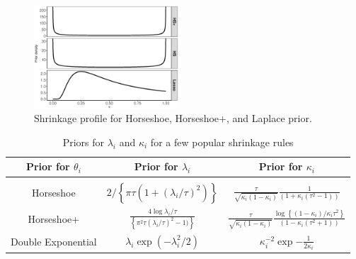 \documentclass[11pt]{article}
\begin{document}
\begin{figure}[!ht]
\centering
\includegraphics[width=0.48\textwidth]{prior_diff_kappa}
\caption{\footnotesize{Shrinkage profile for Horseshoe, Horseshoe+, and Laplace prior.}}
\label{fig:priorkappa}
\end{figure}

\begin{table}[!ht]
\centering
\caption{Priors for $\lambda_i$ and $\kappa_i$ for a few popular shrinkage rules}
\begin{tabular}{ccc}
\hline
Prior for $\theta_i$ & Prior for $\lambda_i$ & Prior for $\kappa_i$ \\ 
\hline \\
Horseshoe & $2/ \left\{ \pi \tau (1 + (\lambda_i/\tau)^2 )\right\}$  & $\frac{\tau}{\sqrt{\kappa_i (1-\kappa_i )}} \frac{1}{(1+\kappa_i (\tau^2 -1 ) )}$ \\[10pt]
Horseshoe+ & $\frac{4\log \lambda_i/\tau}{\left\{{\pi^2 \tau}(\lambda_i/\tau)^2 -1)\right\}}$ &  $\frac{\tau}{\sqrt{\kappa_i (1-\kappa_i )}}\frac{\log \left \{ ( 1 - \kappa_i ) / \kappa_i \tau^2 \right \}}{ (1-\kappa_i (\tau^2 +1 ))}$ \\[10pt]
Double Exponential & $\lambda_i \exp (-\lambda_i^2/2)$ & $\kappa_i^{-2} \exp{-\frac{1}{2\kappa_i}}$ \\
\hline 
\end{tabular}
\end{table}
\end{document}
